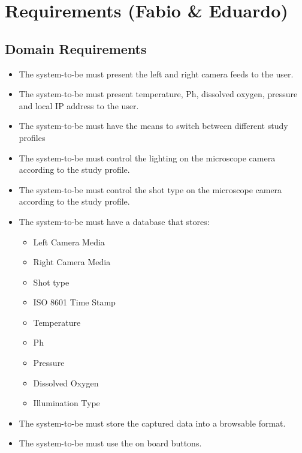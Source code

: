 \section{Requirements (Fabio \& Eduardo)}
\subsection{Domain Requirements}
\begin{itemize}
	\item The system-to-be must present the left and right camera feeds to the user.
	\item The system-to-be must present temperature, Ph, dissolved oxygen, pressure and local IP address to the user.
	\item The system-to-be must have the means to switch between different study profiles
	\item The system-to-be must control the lighting on the microscope camera according to the study profile.
	\item The system-to-be must control the shot type on the microscope camera according to the study profile.
	\item The system-to-be must have a database that stores:
	      \begin{itemize}
		      \item Left Camera Media
		      \item Right Camera Media
		      \item Shot type
		      \item ISO 8601 Time Stamp
		      \item Temperature
		      \item Ph
		      \item Pressure
		      \item Dissolved Oxygen
		      \item Illumination Type
	      \end{itemize}
	\item The system-to-be must store the captured data into a browsable format.
	\item The system-to-be must use the on board buttons.
\end{itemize}
